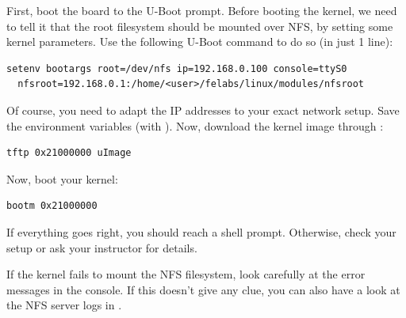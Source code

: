 First, boot the board to the U-Boot prompt.  Before booting the
kernel, we need to tell it that the root filesystem should be mounted
over NFS, by setting some kernel parameters.  Use the following U-Boot
command to do so (in just 1 line):

\scriptsize
\begin{verbatim}
setenv bootargs root=/dev/nfs ip=192.168.0.100 console=ttyS0
  nfsroot=192.168.0.1:/home/<user>/felabs/linux/modules/nfsroot
\end{verbatim}
\normalsize

Of course, you need to adapt the IP addresses to your exact network
setup. Save the environment variables (with ).  Now, download
the kernel image through :

\begin{verbatim}
tftp 0x21000000 uImage
\end{verbatim}

Now, boot your kernel:

\begin{verbatim}
bootm 0x21000000
\end{verbatim}

If everything goes right, you should reach a shell prompt. Otherwise,
check your setup or ask your instructor for details.

If the kernel fails to mount the NFS filesystem, look carefully at the
error messages in the console. If this doesn't give any clue, you can
also have a look at the NFS server logs in .
